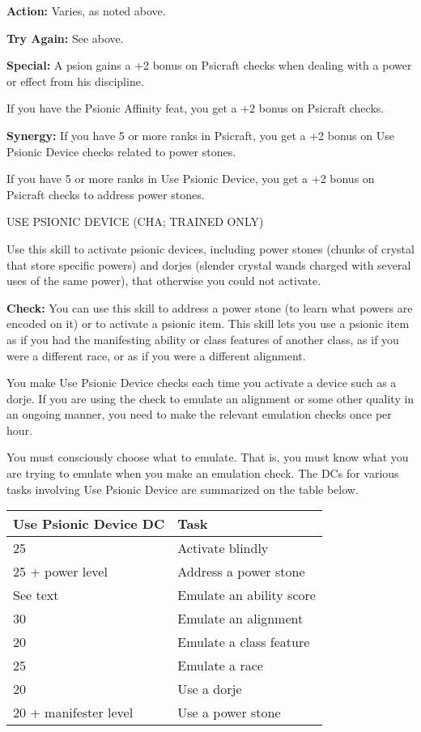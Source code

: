 \documentclass{article}
\begin{document}
\textbf{Action: }Varies, as noted above. 

\textbf{Try Again:} See above.

\textbf{Special:} A psion gains a +2 bonus on Psicraft checks when dealing with 
a power or effect from his discipline.

If you have the Psionic Affinity feat, you get a +2 bonus on Psicraft checks.

\textbf{Synergy: }If you have 5 or more ranks in Psicraft, you get a +2 bonus on 
Use Psionic Device checks related to power stones.

If you have 5 or more ranks in Use Psionic Device, you get a +2 bonus on Psicraft 
checks to address power stones.

\vspace{12pt}
USE PSIONIC DEVICE (CHA; TRAINED ONLY)

Use this skill to activate psionic devices, including power stones (chunks of crystal 
that store specific powers) and  dorjes (slender crystal wands charged with several 
uses of the same power), that otherwise you could not activate.

\textbf{Check:} You can use this skill to address a power stone (to learn what 
powers are encoded on it) or to activate a psionic item. This skill lets you use 
a psionic item as if you had the manifesting ability or class features of another 
class, as if you were a different race, or as if you were a different alignment.

You make Use Psionic Device checks each time you activate a device such as a dorje. 
If you are using the check to emulate an alignment or some other quality in an 
ongoing manner, you need to make the relevant emulation checks once per hour.

You must consciously choose what to emulate. That is, you must know what you are 
trying to emulate when you make an emulation check. The DCs for various tasks involving 
Use Psionic Device are summarized on the table below.

\vspace{12pt}
\begin{tabular}{|>{\raggedright}p{95pt}|>{\raggedright}p{95pt}|}
\hline
U\textbf{se Psionic Device DC} & T\textbf{ask}\tabularnewline
\hline
25 & Activate blindly\tabularnewline
\hline
25 + power level & Address a power stone\tabularnewline
\hline
See text & Emulate an ability score\tabularnewline
\hline
30 & Emulate an alignment\tabularnewline
\hline
20 & Emulate a class feature\tabularnewline
\hline
25 & Emulate a race\tabularnewline
\hline
20 & Use a dorje\tabularnewline
\hline
20 + manifester level & Use a power stone\tabularnewline
\hline
\end{tabular}
\end{document}
